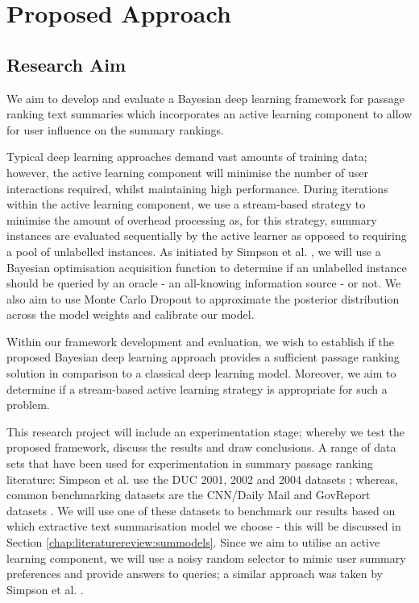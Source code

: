 \documentclass[ %
                    author={James Stephenson},
                supervisor={Dr. Edwin Simpson},
                    degree={MSc},
                     title={PROJECT PLAN},
                  subtitle={Bayesian Deep Learning For Extractive Test Summarisation},
                      type={},
                      year={2022}]{../additions/dissertation}
\begin{document}
		\section{Proposed Approach}
		\label{chap:introduction:prop_approach}
		
			\subsection{Research Aim}
			\label{chap:introduction:prop_approach:aim}
			
				We aim to develop and evaluate a Bayesian deep learning framework for passage ranking text summaries which incorporates an active learning component to allow for user influence on the summary rankings.
				
				\medbreak
				Typical deep learning approaches demand vast amounts of training data; however, the active learning component will minimise the number of user interactions required, whilst maintaining high performance. During iterations within the active learning component, we use a stream-based strategy to minimise the amount of overhead processing as, for this strategy, summary instances are evaluated sequentially by the active learner as opposed to requiring a pool of unlabelled instances. As initiated by Simpson et al. \cite{Simpson19}, we will use a Bayesian optimisation acquisition function to determine if an unlabelled instance should be queried by an oracle - an all-knowing information source - or not. We also aim to use Monte Carlo Dropout \cite{Gal15} to approximate the posterior distribution across the model weights and calibrate our model.

				\medbreak
				Within our framework development and evaluation, we wish to establish if the proposed Bayesian deep learning approach provides a sufficient passage ranking solution in comparison to a classical deep learning model. Moreover, we aim to determine if a stream-based active learning strategy is appropriate for such a problem.
				
				\medbreak
				This research project will include an experimentation stage; whereby we test the proposed framework, discuss the results and draw conclusions. A range of data sets that have been used for experimentation in summary passage ranking literature: Simpson et al. use the DUC 2001, 2002 and 2004 datasets \cite{Simpson19}; whereas, common benchmarking datasets are the CNN/Daily Mail and GovReport datasets \cite{Nallapati16, Huang21}. We will use one of these datasets to benchmark our results based on which extractive text summarisation model we choose - this will be discussed in Section \ref{chap:literaturereview:summodels}. Since we aim to utilise an active learning component, we will use a noisy random selector to mimic user summary preferences and provide answers to queries; a similar approach was taken by Simpson et al. \cite{Simpson19}.
				
\end{document}
